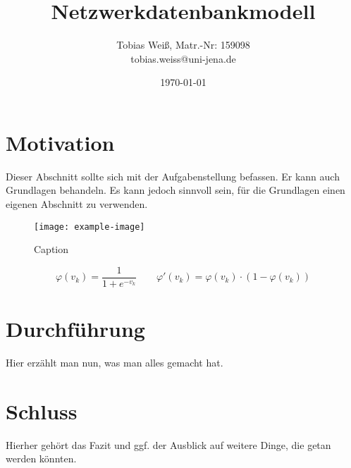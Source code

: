 \documentclass[ngerman,11pt,a4paper,paper=a4,oneside,parskip=half+]{scrarticle}
\begin{document}
\titlehead{MW31.6 -- Data and Knowledge Management}
\subject{Handout}
\title{Netzwerkdatenbankmodell}
\author{Tobias Weiß, Matr.-Nr: 159098\\tobias.weiss@uni-jena.de}
\date{\today}
\maketitle
\tableofcontents
\section{Motivation}
Dieser Abschnitt sollte sich mit der Aufgabenstellung befassen. Er kann auch
Grundlagen behandeln. Es kann jedoch sinnvoll sein, für die Grundlagen einen
eigenen Abschnitt zu verwenden.


\begin{figure}[htbp]
  \centering
  \texttt{[image: example-image]}
  \caption{Caption}
  \label{fig:figure}
\end{figure}


\begin{equation}
    \varphi(v_k) = \frac{1}{1+e^{-v_k}} 
    \qquad
    \varphi'(v_k) = \varphi(v_k) \cdot (1 - \varphi(v_k))
\label{eq:sigmoid}
\end{equation}

\section{Durchführung}
Hier erzählt man nun, was man alles gemacht hat.
\section{Schluss}
Hierher gehört das Fazit und ggf. der Ausblick auf weitere Dinge, die getan
werden könnten.
\end{document}
